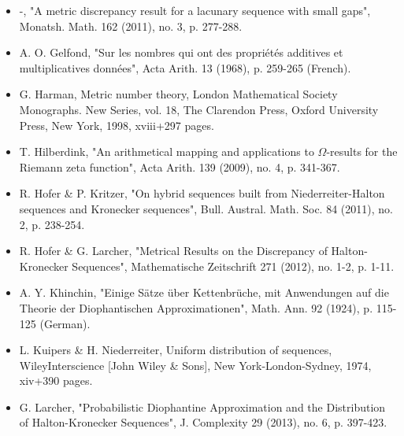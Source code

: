 \documentclass[10pt]{article}
\begin{document}
\begin{itemize}
  \item[] [20] -, "A metric discrepancy result for a lacunary sequence with small gaps", Monatsh. Math. 162 (2011), no. 3, p. 277-288.
  \item[] [21] A. O. Gelfond, "Sur les nombres qui ont des propriétés additives et multiplicatives données", Acta Arith. 13 (1968), p. 259-265 (French).
  \item[] [22] G. Harman, Metric number theory, London Mathematical Society Monographs. New Series, vol. 18, The Clarendon Press, Oxford University Press, New York, 1998, xviii+297 pages.
  \item[] [23] T. Hilberdink, "An arithmetical mapping and applications to $\Omega$-results for the Riemann zeta function", Acta Arith. 139 (2009), no. 4, p. 341-367.
  \item[] [24] R. Hofer \& P. Kritzer, "On hybrid sequences built from Niederreiter-Halton sequences and Kronecker sequences", Bull. Austral. Math. Soc. 84 (2011), no. 2, p. 238-254.
  \item[] [25] R. Hofer \& G. Larcher, "Metrical Results on the Discrepancy of Halton-Kronecker Sequences", Mathematische Zeitschrift 271 (2012), no. 1-2, p. 1-11.
  \item[] [26] A. Y. Khinchin, "Einige Sätze über Kettenbrüche, mit Anwendungen auf die Theorie der Diophantischen Approximationen", Math. Ann. 92 (1924), p. 115-125 (German).
  \item[] [27] L. Kuipers \& H. Niederreiter, Uniform distribution of sequences, WileyInterscience [John Wiley \& Sons], New York-London-Sydney, 1974, xiv+390 pages.
  \item[] [28] G. Larcher, "Probabilistic Diophantine Approximation and the Distribution of Halton-Kronecker Sequences", J. Complexity 29 (2013), no. 6, p. 397-423.
\end{itemize}
\end{document}
